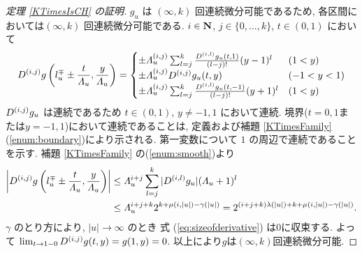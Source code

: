 \begin{proof}[\rm 定理 \ref{KTimesIsCH} の証明]
 $g_u$ は $(\infty, k)$ 回連続微分可能であるため,
 各区間においては$(\infty, k)$ 回連続微分可能である.
 $i \in \mathbf N$, $j \in \{0, \dots, k\}$, $t \in (0, 1)$ において
\begin{equation}
   D^{(i, j)}g \left(l^\mp_u \pm \frac{t}{\varLambda_u}, \frac{y}{\varLambda_u}\right)
   = \begin{cases}
      \pm \varLambda_u^{(i, j)} \sum^{k}_{l=j} \frac{D^{(i,l)} g_u(t,1)}{(l-j)!}
      (y - 1)^l &  (1<y)
      \\
      \pm \varLambda_u^{(i,j)} D^{(i, j)} g_u(t, y) & (-1 < y < 1)
      \\
      \pm \varLambda_u^{(i, j)} \sum^{k}_{l=j} 
      \frac{D^{(i,l)} g_u(t, -1)}{(l-j)!} (y + 1)^l &  (1<y)
    \end{cases}
\end{equation}
 $D^{(i,j)}g_u$ は連続であるため 
 $t \in (0,1)$, $y \not = -1, 1$ において連続.
 境界($t = 0, 1$または$y = -1, 1$)において連続であることは,
 定義および補題 \ref{KTimesFamily} (\ref{enum:boundary})により示される.
 第一変数について $1$ の周辺で連続であることを示す.
 補題 \ref{KTimesFamily} の(\ref{enum:smooth})より
 \begin{align}
  \left|D^{(i, j)}g \left(l^\mp_u \pm \frac{t}{\varLambda_u},
  \frac{y}{\varLambda_u}\right)\right|
  &\le 
  \varLambda_u^{i+j} \sum^{k}_{l=j} |D^{(i,l)} g_u | (\varLambda_u + 1)^l 
  \notag
  \\
  & \le \varLambda_u^{i+j+k}  2^{k + \mu(i, |u|) - \gamma(|u|)}
   =  2^{(i+j+k)\lambda(|u|) + k + \mu(i, |u|)  - \gamma(|u|)}. 
  \label{eq:sizeofderivative}
 \end{align}
 $\gamma$ のとり方により, $|u| \to \infty$ のとき 
 式 (\ref{eq:sizeofderivative}) は$0$に収束する.
 よって  $\lim_{t \to 1-0}D^{(i,j)} g(t,y) = g(1, y) = 0$.
 以上により$g$は$(\infty, k)$回連続微分可能.
\end{proof}


